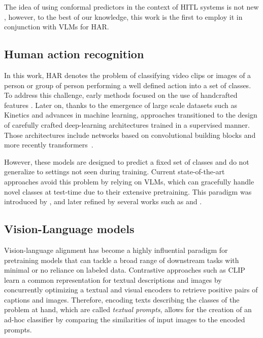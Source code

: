 The idea of using conformal predictors in the context of HITL systems is not new \cite{zhan2020electronic, cresswell2024conformal}, however, to the best of our knowledge, this work is the first to employ it in conjunction with VLMs for HAR.

\subsection{Human action recognition}
In this work, HAR denotes the problem of classifying video clips or images of a person or group of person performing a well defined action into a set of classes. To address this challenge, early methods focused on the use of handcrafted features \cite{dollar2005behavior, wang2013dense}. Later on, thanks to the emergence of large scale datasets such as Kinetics \cite{carreira2017quo} and advances in machine learning, approaches transitioned to the design of carefully crafted deep-learning architectures trained in a supervised manner. Those architectures include networks based on convolutional building blocks \cite{wang2016temporal, feichtenhofer2019slowfast, jiang2019stm} and more recently transformers~\cite{arnab2021vivit}. 

However, these models are designed to predict a fixed set of classes and do not generalize to settings not seen during training. Current state-of-the-art approaches avoid this problem by relying on VLMs, which can gracefully handle novel classes at test-time due to their extensive pretraining. This paradigm was introduced by \cite{wang2021actionclip}, and later refined by several works such as \cite{ni2022expanding} and \cite{rasheed2023fine}.

\subsection{Vision-Language models}
Vision-language alignment has become a highly influential paradigm for pretraining models that can tackle a broad range of downstream tasks with minimal or no reliance on labeled data. Contrastive approaches such as CLIP~\cite{radford_learning_2021} learn a common representation for textual descriptions and images by concurrently optimizing a textual and visual encoders to retrieve positive pairs of captions and images. Therefore, encoding texts describing the classes of the problem at hand, which are called \textit{textual prompts}, allows for the creation of an ad-hoc classifier by comparing the similarities of input images to the encoded prompts. 

